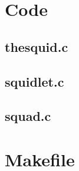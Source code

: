 \begin{scriptsize}
\begin{ttfamily}

\end{ttfamily}
\end{scriptsize}

\section{Code}

\subsection{thesquid.c}

\begin{scriptsize}
\begin{ttfamily}

\end{ttfamily}
\end{scriptsize}

\subsection{squidlet.c}

\begin{scriptsize}
\begin{ttfamily}

\end{ttfamily}
\end{scriptsize}

\subsection{squad.c}

\begin{scriptsize}
\begin{ttfamily}

\end{ttfamily}
\end{scriptsize}

\section{Makefile}

\begin{scriptsize}
\begin{ttfamily}

\end{ttfamily}
\end{scriptsize}

